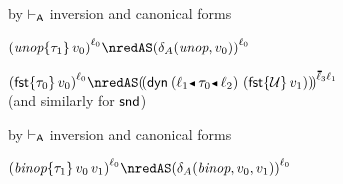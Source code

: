 {\begin{lamportproof*}
    \begin{pfproof}
        \begin{pfproof}
          by $\vdash_{\mathsf{A}}$ inversion and canonical forms
        \end{pfproof}
        \begin{pfproof}
          \qedstep
            \begin{pfproof}
              $\obars{\eunopt{\stype_1}{\svalue_0}}{\sowner_0} \nredAS \obars{\sdeltaA(\sunop, \svalue_0)}{\sowner_0}$
            \end{pfproof}
        \end{pfproof}
        \begin{pfproof}
          \qedstep
            \begin{pfproof}
              $\obars{\efst{{\stype_0}}{\svalue_0}}{\sowner_0} \nredAS \obbars{\edynb{\obnd{\sowner_1}{\stype_0}{\sowner_2}}{(\efst{\tdyn}{\svalue_1})}}{\fconcat{\sownerlist_3}{\sowner_1}}$
              \\(and similarly for $\mathsf{snd}$)
            \end{pfproof}
        \end{pfproof}
    \end{pfproof}

    \begin{pfproof}
        \begin{pfproof}
          by $\vdash_{\mathsf{A}}$ inversion and canonical forms
        \end{pfproof}
      \qedstep
        \begin{pfproof}
          $\obars{\ebinopt{\stype_1}{\svalue_0}{\svalue_1}}{\sowner_0} \nredAS \obars{\sdeltaA(\sbinop, \svalue_0, \svalue_1)}{\sowner_0}$
        \end{pfproof}
    \end{pfproof}


\end{lamportproof*}}
